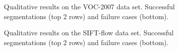 \begin{figure}
\begin{center}
\fbox{\rule{0pt}{2in} \rule{.9\linewidth}{0pt}}
\end{center}
   \caption{Qualitative results on the VOC-2007 data set. Successful segmentations (top 2 rows) and failure cases (bottom).}
\label{fig:VOC-2007}
\end{figure}

\begin{figure}
\begin{center}
\fbox{\rule{0pt}{2in} \rule{.9\linewidth}{0pt}}
\end{center}
   \caption{Qualitative results on the SIFT-flow data set. Successful segmentations (top 2 rows) and failure cases (bottom).}
\label{fig:SIFT-flow}
\end{figure}


